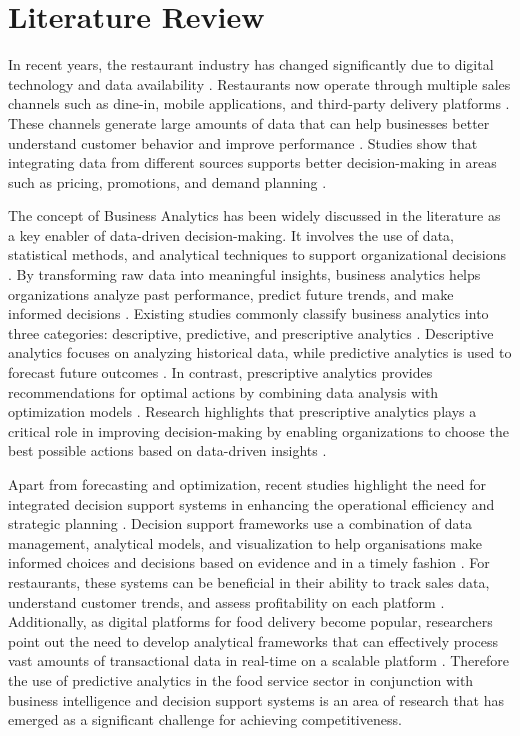 \section{Literature Review}

In recent years, the restaurant industry has changed significantly due to digital technology and data availability \cite{almeida2023time}. Restaurants now operate through multiple sales channels such as dine-in, mobile applications, and third-party delivery platforms \cite{li2024criticality}. These channels generate large amounts of data that can help businesses better understand customer behavior and improve performance \cite{marciano2020big}. Studies show that integrating data from different sources supports better decision-making in areas such as pricing, promotions, and demand planning \cite{wu2025does}.

The concept of Business Analytics has been widely discussed in the literature as a key enabler of data-driven decision-making. It involves the use of data, statistical methods, and analytical techniques to support organizational decisions \cite{liu2023review}. By transforming raw data into meaningful insights, business analytics helps organizations analyze past performance, predict future trends, and make informed decisions \cite{soldic2025business}. Existing studies commonly classify business analytics into three categories: descriptive, predictive, and prescriptive analytics \cite{sharma2022analytics}. Descriptive analytics focuses on analyzing historical data, while predictive analytics is used to forecast future outcomes \cite{almeida2023time}. In contrast, prescriptive analytics provides recommendations for optimal actions by combining data analysis with optimization models \cite{frazzetto2019prescriptive}. Research highlights that prescriptive analytics plays a critical role in improving decision-making by enabling organizations to choose the best possible actions based on data-driven insights \cite{berkhout2024revisiting}. 

Apart from forecasting and optimization, recent studies highlight the need for integrated decision support systems in enhancing the operational efficiency and strategic planning \citep{roy2022restaurant}. Decision support frameworks use a combination of data management, analytical models, and visualization to help organisations make informed choices and decisions based on evidence and in a timely fashion \citep{tajeddini2026smart}. For restaurants, these systems can be beneficial in their ability to track sales data, understand customer trends, and assess profitability on each platform \citep{shah2025exploring}. Additionally, as digital platforms for food delivery become popular, researchers point out the need to develop analytical frameworks that can effectively process vast amounts of transactional data in real-time on a scalable platform \citep{majid2019role}. Therefore the use of predictive analytics in the food service sector in conjunction with business intelligence and decision support systems is an area of research that has emerged as a significant challenge for achieving competitiveness.

